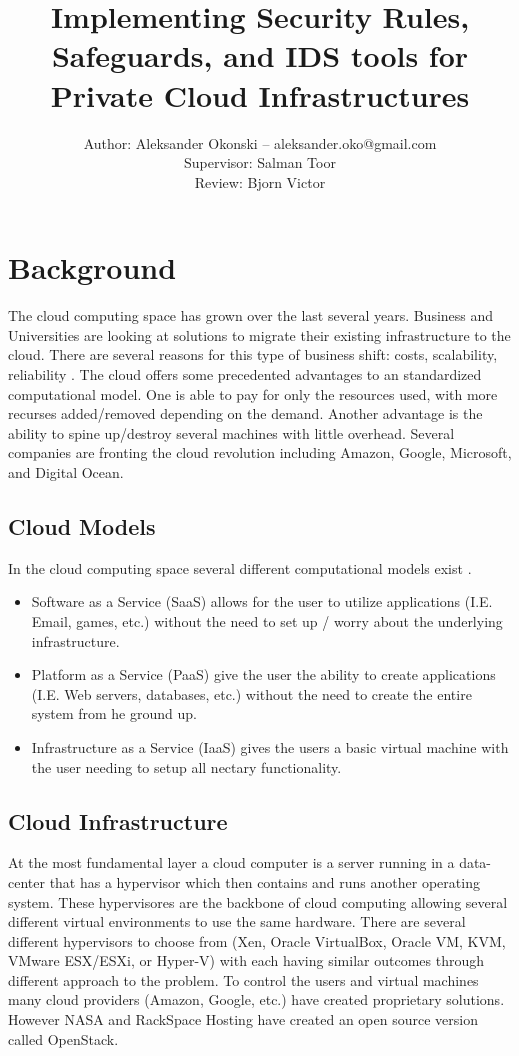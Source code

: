 \documentclass[12pt]{article}
\title{Implementing Security Rules, Safeguards, and IDS tools for Private Cloud Infrastructures}
\author{Author: Aleksander Okonski -- aleksander.oko@gmail.com \\ Supervisor: Salman Toor \\ Review: Bjorn Victor }
\date{}
\begin{document}
\maketitle
\newpage
\tableofcontents
\newpage

\section{Background}
The cloud computing space has grown over the last several years. Business and Universities are looking at solutions to migrate their existing infrastructure to the cloud. There are several reasons for this type of business shift: costs, scalability, reliability \cite{DillonWuChang}. The cloud offers some precedented advantages to an standardized computational model. One is able to pay for only the resources used, with more recurses added/removed depending on the demand. Another advantage is the ability to spine up/destroy several machines with little overhead. Several companies are fronting the cloud revolution including Amazon, Google, Microsoft, and Digital Ocean.

\subsection{Cloud Models}
In the cloud computing space several different computational models exist \cite{wikipedia}.

\begin{itemize}
    \item Software as a Service (SaaS) allows for the user to utilize applications (I.E. Email, games, etc.) without the need to set up / worry about the underlying infrastructure.
    \item Platform as a Service (PaaS) give the user the ability to create applications (I.E. Web servers, databases, etc.) without the need to create the entire system from he ground up.
    \item Infrastructure as a Service (IaaS) gives the users a basic virtual machine with the user needing to setup all nectary functionality.
\end{itemize}

\subsection{Cloud Infrastructure}
At the most fundamental layer a cloud computer is a server running in a data-center that has a hypervisor which then contains and runs another operating system. These hypervisores are the backbone of cloud computing allowing several different virtual environments to use the same hardware. There are several different hypervisors to choose from (Xen, Oracle VirtualBox, Oracle VM, KVM, VMware ESX/ESXi, or Hyper-V) with each having similar outcomes through different approach to the problem. To control the users and virtual machines many cloud providers (Amazon, Google, etc.) have created proprietary solutions. However NASA and RackSpace Hosting \cite{wikipedia1} have created an open source version called OpenStack.
\end{document}
